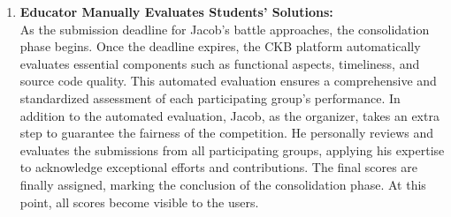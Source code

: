 \begin{enumerate}

    \item \textbf{Educator Manually Evaluates Students' Solutions:} \\
    As the submission deadline for Jacob's battle approaches, the consolidation phase begins. Once the deadline expires, the CKB platform automatically evaluates essential components such as functional aspects, timeliness, and source code quality. This automated evaluation ensures a comprehensive and standardized assessment of each participating group's performance. In addition to the automated evaluation, Jacob, as the organizer, takes an extra step to guarantee the fairness of the competition. He personally reviews and evaluates the submissions from all participating groups, applying his expertise to acknowledge exceptional efforts and contributions. The final scores are finally assigned, marking the conclusion of the consolidation phase. At this point, all scores become visible to the users. 
    


\end{enumerate}

